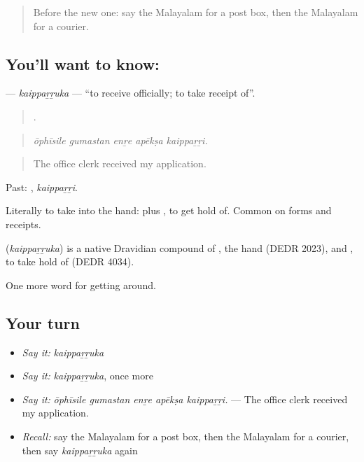 \label{lesson:ML-C490-kaipparruka}



\begin{quote}
Before the new one: say the Malayalam for a post box, then the Malayalam for a courier.
\end{quote}

\subsection*{You'll want to know: }
\textbf{} — \emph{kaippaṟṟuka} — \textquotedblleft{}to receive officially; to take receipt of\textquotedblright{}.

\begin{quote}
    .
\end{quote}

\begin{quote}
\emph{ōphīsile gumastan enṟe apēkṣa kaippaṟṟi.}
\end{quote}

\begin{quote}
The office clerk received my application.
\end{quote}

Past: , \emph{kaippaṟṟi}.

Literally to take into the hand:  plus , to get hold of. Common on forms and receipts.

\begin{cousinweb}
\textbf{} (\emph{kaippaṟṟuka}) is a native Dravidian compound of , the hand (DEDR 2023), and , to take hold of (DEDR 4034).
\end{cousinweb}

\begin{grammarlens}[title={What you've built}]
One more word for getting around.
\end{grammarlens}

\subsection*{Your turn}
\begin{itemize}
\raggedright
  \item \emph{Say it:} \emph{kaippaṟṟuka}
  \item \emph{Say it:} \emph{kaippaṟṟuka}, once more
  \item \emph{Say it:} \emph{ōphīsile gumastan enṟe apēkṣa kaippaṟṟi.} — The office clerk received my application.
  \item \emph{Recall:} say the Malayalam for a post box, then the Malayalam for a courier, then say \emph{kaippaṟṟuka} again
\end{itemize}

